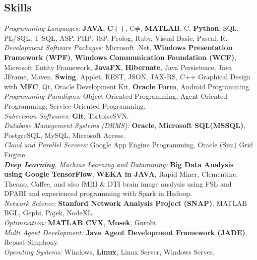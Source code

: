 \documentclass[letter]{res}
\begin{document}
\begin{resume}
		\section{Skills}
		\textit{Programming Languages: }\textbf{JAVA}, \textbf{C++}, C\#, \textbf{MATLAB}, C, \textbf{Python}, SQL, PL/SQL, T-SQL, ASP, PHP, JSP, Prolog, Ruby, Visual Basic, Pascal, R.\\
		\textit{Development Software Packages: }Microsoft .Net, \textbf{Windows Presentation Framework (WPF)}, \textbf{Windows Communication Foundation (WCF)}, Microsoft Entity Framework, \textbf{JavaFX}, \textbf{Hibernate}, Java Persistence, Java JFrame, Maven, \textbf{Swing}, Applet, REST, JSON, JAX-RS, C++ Graphical Design with \textbf{MFC}, Qt, Oracle Development Kit, \textbf{Oracle Form}, Android Programming.\\
		\textit{Programming Paradigms: }Object-Oriented Programming, Agent-Oriented Programming, Service-Oriented Programming.\\
		\textit{Subversion Softwares: }\textbf{Git}, TortoiseSVN.\\
		\textit{Database Management Systems (DBMS): }\textbf{Oracle}, \textbf{Microsoft SQL(MSSQL)}, PostgreSQL, MySQL, Microsoft Access.\\
		{\sl Cloud and Parallel Servers: }Google App Engine Programming, Oracle (Sun) Grid Engine.\\
		{\sl \textbf{Deep Learning}, Machine Learning and Datamining: }\textbf{Big Data Analysis using Google TensorFlow}, \textbf{WEKA in JAVA}, Rapid Miner, Clementine, Theano, Caffee, and also fMRI \& DTI brain image analysis using FSL and DPABI and experienced programming with Spark in Hadoop.\\
		{\sl Network Science: }\textbf{Stanford Network Analysis Project (SNAP)}, MATLAB BGL, Gephi, Pajek, NodeXL.\\
		{\sl Optimization: }\textbf{MATLAB CVX}, \textbf{Mosek}, Gurobi.\\
		{\sl Multi Agent Development: }\textbf{Java Agent Development Framework (JADE)}, Repast Simphony.\\
		\textit{Operating Systems: }Windows, \textbf{Linux}, Linux Server, Windows Server.
		

\end{resume}
\end{document}
